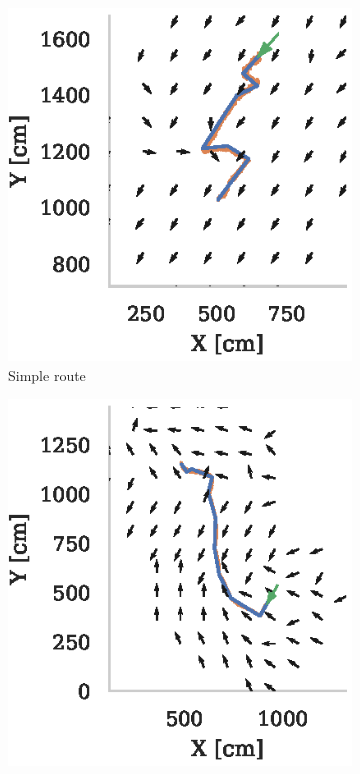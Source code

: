 \documentclass[letterpaper]{article}
\begin{document}
\begin{figure}[t]
    \centering
    \begin{subfigure}[b]{0.3\textwidth}
        \includegraphics{figures/vector_field_route2_PerfectMemory_mask.eps}
        \caption{Simple route}
        \label{fig:vector_fields/route2_perfect_memory_mask}
    \end{subfigure}
    \begin{subfigure}[b]{0.3\textwidth}
        \includegraphics{figures/vector_field_route5_PerfectMemory_mask.eps}

\end{subfigure}
\end{figure}
\end{document}

